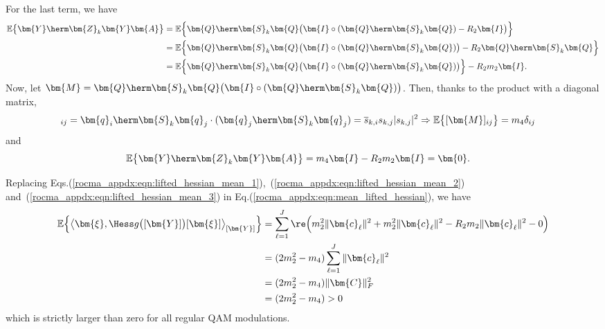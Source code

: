 For the last term, we have
\begin{align}
	\mathbb{E}\big\{\bm{Y}\herm\bm{Z}_k\bm{Y}\bm{A}\big\}&=\mathbb{E}\Big\{\bm{Q}\herm\bm{S}_k\bm{Q}\big(\bm{I}\circ(\bm{Q}\herm\bm{S}_k\bm{Q})-R_2\bm{I}\big)\Big\}\nonumber\\
	&=\mathbb{E}\Big\{\bm{Q}\herm\bm{S}_k\bm{Q}\big(\bm{I}\circ(\bm{Q}\herm\bm{S}_k\bm{Q})\big)-R_2\bm{Q}\herm\bm{S}_k\bm{Q}\Big\}\nonumber\\
	&=\mathbb{E}\Big\{\bm{Q}\herm\bm{S}_k\bm{Q}\big(\bm{I}\circ(\bm{Q}\herm\bm{S}_k\bm{Q})\big)\Big\}-R_2m_2\bm{I}.\nonumber
\end{align}
Now, let $\bm{M}=\bm{Q}\herm\bm{S}_k\bm{Q}\big(\bm{I}\circ(\bm{Q}\herm\bm{S}_k\bm{Q})\big)$. Then, thanks to the product with a diagonal matrix,
\begin{align}
	[\bm{M}]_{ij}&=\bm{q}_i\herm\bm{S}_k\bm{q}_j\cdot(\bm{q}_j\herm\bm{S}_k\bm{q}_j)=\overline{s}_{k,i}s_{k,j}|s_{k,j}|^2
	\Rightarrow \mathbb{E}\big\{[\bm{M}]_{ij}\big\}=m_4\delta_{ij}\nonumber
\end{align}
and
\begin{align}
	\mathbb{E}\big\{\bm{Y}\herm\bm{Z}_k\bm{Y}\bm{A}\big\}
	&=m_4\bm{I}-R_2m_2\bm{I}=\bm{0}.\label{rocma_appdx:eqn:lifted_hessian_mean_3}
\end{align}

Replacing Eqs.(\ref{rocma_appdx:eqn:lifted_hessian_mean_1}),~(\ref{rocma_appdx:eqn:lifted_hessian_mean_2}) and~(\ref{rocma_appdx:eqn:lifted_hessian_mean_3}) in Eq.(\ref{rocma_appdx:eqn:mean_lifted_hessian}), we have
\begin{align}
	\mathbb{E}\Big\{\big\langle \bm{\xi},\Hess g \big([\bm{Y}]\big)[\bm{\xi}]\big\rangle_{[\bm{Y}]}\Big\}
	&= \sum_{\ell=1}^J\re\Big(m_2^2\|\bm{c}_{\ell}\|^2 +m_2^2\|\bm{c}_{\ell}\|^2-R_2m_2\|\bm{c}_{\ell}\|^2 -0\Big)\nonumber\\
	&= (2m_2^2-m_4)\sum_{\ell=1}^J\|\bm{c}_{\ell}\|^2\nonumber\\
	&=(2m_2^2-m_4)\|\bm{C}\|_F^2\nonumber\\
	&=(2m_2^2-m_4)>0\nonumber
\end{align}
which is strictly larger than zero for all regular QAM modulations.


